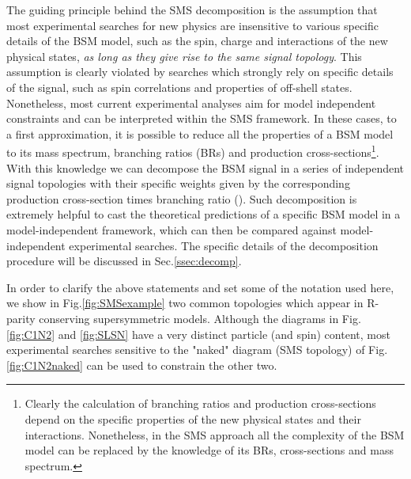 The guiding principle behind the SMS decomposition is the assumption that most experimental searches
for new physics are insensitive to various specific details of the BSM model, such as the spin, charge and interactions
of the new physical states, {\it as long as they give rise to the same signal topology}. 
This assumption is clearly violated by searches which strongly rely on specific details of the
signal, such as spin correlations and properties of off-shell states. Nonetheless, 
most current experimental analyses aim for model independent constraints and can 
be interpreted within the SMS framework.
In these cases, to a first approximation, it is possible to reduce all the properties of a BSM model to its mass
spectrum, branching ratios (BRs) and production cross-sections\footnote{Clearly the calculation of branching ratios and production cross-sections depend on the specific properties of the new physical states and their interactions.
 Nonetheless, in the SMS approach all the complexity of the BSM model can be replaced
by the knowledge of its BRs, cross-sections and mass spectrum.}.
With this knowledge we can decompose the BSM signal in a series of independent signal topologies with their specific weights given
by the corresponding production cross-section times branching ratio (\sigmaXBF). Such decomposition is extremely helpful to cast the theoretical
predictions of a specific BSM model in a model-independent framework, which can then be compared against model-independent experimental searches.
The specific details of the decomposition procedure will be discussed in Sec.\ref{ssec:decomp}.


In order to clarify the above statements and set some of the notation used here, we show in Fig.\ref{fig:SMSexample} two common topologies which appear
in R-parity conserving supersymmetric models. Although the diagrams in Fig.\ref{fig:C1N2} and \ref{fig:SLSN} have a very distinct particle (and spin) content, 
most experimental searches sensitive to the "naked" diagram (SMS topology) of Fig.\ref{fig:C1N2naked} can be used to constrain the other two.

